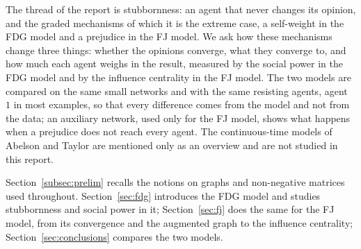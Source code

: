 The thread of the report is stubbornness: an agent that never changes its opinion, and
the graded mechanisms of which it is the extreme case, a self-weight in the FDG model and
a prejudice in the FJ model. We ask how these mechanisms change three things: whether the
opinions converge, what they converge to, and how much each agent weighs in the result,
measured by the social power in the FDG model and by the influence centrality in the FJ
model. The two models are compared on the same small networks and with the same
resisting agents, agent~$1$ in most examples, so that every difference comes from the
model and not from the data; an auxiliary network, used only for the FJ model, shows
what happens when a prejudice does not reach every agent.
The continuous-time models of Abelson and Taylor are mentioned only as an overview and
are not studied in this report.

Section~\ref{subsec:prelim} recalls the notions on graphs and non-negative matrices used
throughout. Section~\ref{sec:fdg} introduces the FDG model and studies stubbornness and
social power in it; Section~\ref{sec:fj} does the same for the FJ model, from its
convergence and the augmented graph to the influence centrality;
Section~\ref{sec:conclusions} compares the two models.



